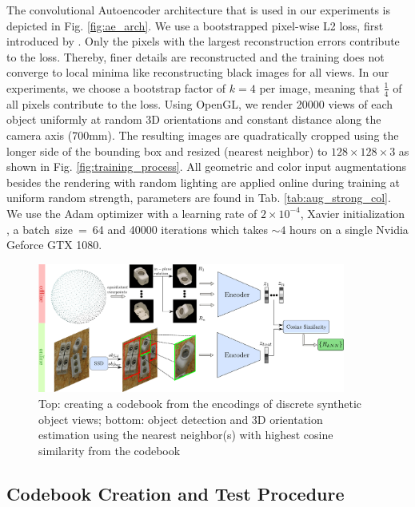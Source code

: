 The convolutional Autoencoder architecture that is used in our experiments is depicted in Fig. \ref{fig:ae_arch}. 
We use a bootstrapped pixel-wise L2 loss, first introduced by \cite{wu2016bridging}. Only the pixels with the largest reconstruction errors contribute to the loss. Thereby, finer details are reconstructed and the training does not converge to local minima like reconstructing black images for all views. In our experiments, we choose a bootstrap factor of $k=4$ per image, meaning that $\frac{1}{4}$ of all pixels contribute to the loss.
Using OpenGL, we render 20000 views of each object uniformly at random 3D orientations and constant distance along the camera axis (700mm). The resulting images are quadratically cropped using the longer side of the bounding box and resized (nearest neighbor) to $128 \times 128 \times 3$ as shown in Fig. \ref{fig:training_process}. All geometric and color input augmentations besides the rendering with random lighting are applied online during training at uniform random strength, parameters are found in Tab. \ref{tab:aug_strong_col}.
We use the Adam \citep{kingma2014adam} optimizer with a learning rate of $2\times 10^{-4}$, Xavier initialization \citep{glorot2010understanding}, a \mbox{batch size = 64} and 40000 iterations which takes $\sim 4$ hours on a single Nvidia Geforce GTX 1080.
\begin{figure}[t]%
	\centering
	\captionsetup{width=0.93\textwidth}
	\includegraphics[width=0.9\textwidth]{test_pipeline.pdf}
	\caption{Top: creating a codebook from the encodings of discrete synthetic object views; bottom: object detection and 3D orientation estimation using the nearest neighbor(s) with highest cosine similarity from the codebook}
	\label{fig:test_pipeline}
\end{figure}
\subsection{Codebook Creation and Test Procedure}


